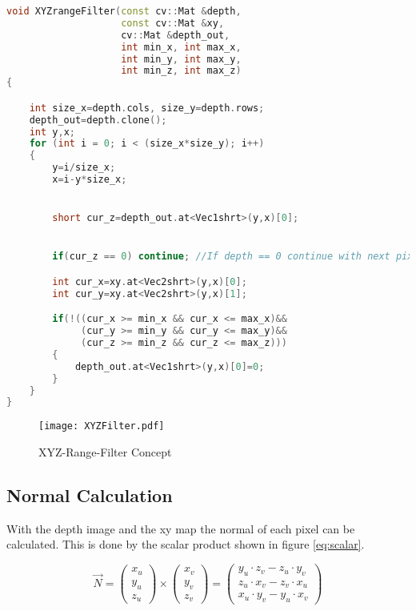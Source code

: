 \begin{lstlisting}[caption={XYZrangeFilter - Function\label{lst:range3d}},language=C++]
void XYZrangeFilter(const cv::Mat &depth, 
                    const cv::Mat &xy, 
                    cv::Mat &depth_out, 
                    int min_x, int max_x, 
                    int min_y, int max_y, 
                    int min_z, int max_z)
{

	int size_x=depth.cols, size_y=depth.rows;
	depth_out=depth.clone();
	int y,x;
	for (int i = 0; i < (size_x*size_y); i++)
	{
		y=i/size_x;
		x=i-y*size_x;


		short cur_z=depth_out.at<Vec1shrt>(y,x)[0];


		if(cur_z == 0) continue; //If depth == 0 continue with next pixel

		int cur_x=xy.at<Vec2shrt>(y,x)[0];
		int cur_y=xy.at<Vec2shrt>(y,x)[1];

		if(!((cur_x >= min_x && cur_x <= max_x)&&
		     (cur_y >= min_y && cur_y <= max_y)&&
		     (cur_z >= min_z && cur_z <= max_z)))
		{
			depth_out.at<Vec1shrt>(y,x)[0]=0;
		}
	}
}
\end{lstlisting}


\begin{figure}[H]
\begin{center}
  \texttt{[image: XYZFilter.pdf]}
  \caption{XYZ-Range-Filter Concept}
  \label{figure:xyzrange}
\end{center}
\end{figure}


\subsection{Normal Calculation}
With the depth image and the xy map the normal of each pixel can be calculated. This is done by the scalar product
shown in figure \vref{eq:scalar}.

\begin{equation}
 \vec{N} =        \left( \begin{array}{c} x_u                           \\                           y_u \\ z_u                           \end{array} \right) 
           \times \left( \begin{array}{c} x_v                           \\                           y_v \\ z_v                           \end{array} \right) 
         =        \left( \begin{array}{c} y_u \cdot z_v - z_u \cdot y_v \\ z_u \cdot x_v - z_v \cdot x_u \\ x_u \cdot y_v - y_u \cdot x_v \end{array}\right)
\label{eq:scalar}
\end{equation}


